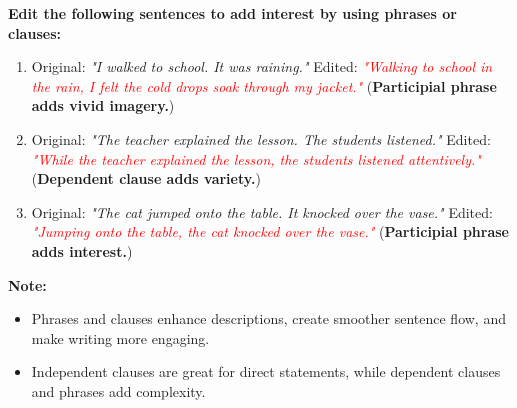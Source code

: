 \documentclass[12pt]{article}
\begin{document}
\vspace{1em}

\begin{tcolorbox}[colframe=black!60, colback=white, 
coltitle=black, colbacktitle=black!15, fonttitle=\bfseries\Large, 
title=Editing Exercises, halign title=center, left=10pt, right=10pt, top=10pt, bottom=15pt]
\textbf{Edit the following sentences to add interest by using phrases or clauses:}
\begin{enumerate}[itemsep=3em]
    \item Original: \textit{"I walked to school. It was raining."}  
    Edited: \textcolor{red}{\textit{"Walking to school in the rain, I felt the cold drops soak through my jacket."}} (\textbf{Participial phrase adds vivid imagery.})

    \item Original: \textit{"The teacher explained the lesson. The students listened."}  
    Edited: \textcolor{red}{\textit{"While the teacher explained the lesson, the students listened attentively."}} (\textbf{Dependent clause adds variety.})

    \item Original: \textit{"The cat jumped onto the table. It knocked over the vase."}  
    Edited: \textcolor{red}{\textit{"Jumping onto the table, the cat knocked over the vase."}} (\textbf{Participial phrase adds interest.})
\end{enumerate}
\end{tcolorbox}

\vspace{1em}

\begin{tcolorbox}[colframe=black!40, colback=gray!5, 
coltitle=black, colbacktitle=black!20, fonttitle=\bfseries\Large, 
title=Additional Notes, halign title=center, left=5pt, right=5pt, top=5pt, bottom=15pt]
\textbf{Note:}
\begin{itemize}
    \item Phrases and clauses enhance descriptions, create smoother sentence flow, and make writing more engaging.
    \item Independent clauses are great for direct statements, while dependent clauses and phrases add complexity.
\end{itemize}
\end{tcolorbox}

\vspace{1em}
\end{document}
